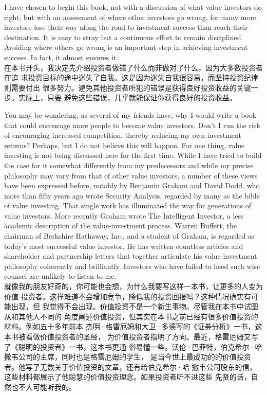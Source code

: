 \begin{verseparallel}
  {
    I have chosen to begin this book, not with a discussion of what value
    investors do right, but with an assessment of where other investors go
    wrong, for many more investors lose their way along the road to investment
    success than reach their destination. It is easy to stray but a continuous
    effort to remain disciplined. Avoiding where others go wrong is an important
    step in achieving investment success. In fact, it almost ensures it. \\
  }
  {
    在本书开头，我决定先介绍投资者做错了什么而非做对了什么，因为大多数投资者在追
    求投资目标的途中迷失了自我。这是因为迷失自我很容易，而坚持投资纪律则需要付出
    很多努力。避免其他投资者所犯的错误是获得良好投资收益的关键一步。实际上，只要
    避免这些错误，几乎就能保证你获得良好的投资收益。
  }
\end{verseparallel}

\begin{verseparallel}
  {
    You may be wondering, as several of my friends have, why I would write a
    book that could encourage more people to become value investors. Don't I run
    the risk of encouraging increased competition, thereby reducing my own
    investment returns? Perhaps, but I do not believe this will happen. For one
    thing, value investing is not being discussed here for the first time. While
    I have tried to build the case for it somewhat differently from my
    predecessors and while my precise philosophy may vary from that of other
    value investors, a number of these views have been expressed before, notably
    by Benjamin Graham and David Dodd, who more than fifty years ago wrote
    Security Analysis, regarded by many as the bible of value investing. That
    single work has illuminated the way for generations of value investors. More
    recently Graham wrote The Intelligent Investor, a less academic description
    of the value-investment process. Warren Buffett, the chairman of Berkshire
    Hathaway, Inc., and a student of Graham, is regarded as today's most
    successful value investor. He has written countless articles and shareholder
    and partnership letters that together articulate his value-investment
    philosophy coherently and brilliantly. Investors who have failed to heed
    such wise counsel are unlikely to listen to me. \\
  }
  {
    就像我的朋友好奇的，你可能也会想，为什么我要写这样一本书，让更多的人变为价值
    投资者。这样难道不会增加竞争，降低我的投资回报吗？这种情况确实有可能出现，但
    我觉得不会出现。价值投资不是一个新生事物。尽管我在本书中试图从和其他人不同的
    角度阐述价值投资，但其实在本书之前已经有很多价值投资的材料。例如五十多年前本
    杰明·格雷厄姆和大卫·多德写的《证券分析》一书，这本书被看做价值投资者的圣经，
    为价值投资者指明了方向。最近，格雷厄姆又写了《聪明的投资者》一书，这本书更通
    俗易懂一些。沃伦·巴菲特，伯克希尔·哈撒韦公司的主席，同时也是格雷厄姆的学生，
    是当今世上最成功的的价值投资者。他写了无数关于价值投资的文章，还有给伯克希尔·哈
    撒韦公司股东的信，这些材料都展示了他聪慧的价值投资理念。如果投资者听不进这些
    先贤的话，自然也不大可能听我的。
  }
\end{verseparallel}

